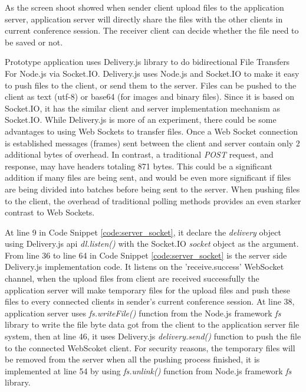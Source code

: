 \par As the screen shoot showed when sender client upload files to the application server, application server will directly share the files with the other clients in current conference session. The receiver client can decide whether the file need to be saved or not.

\par Prototype application uses Delivery.js library to do bidirectional File Transfers For Node.js via Socket.IO. Delivery.js uses Node.js and Socket.IO to make it easy to push files to the client, or send them to the server. Files can be pushed to the client as text (utf-8) or base64 (for images and binary files).\cite{github:deliveryjs} Since it is based on Socket.IO, it has the similar client and server implementation mechanism as Socket.IO. While Delivery.js is more of an experiment, there could be some advantages to using Web Sockets to transfer files. Once a Web Socket connection is established messages (frames) sent between the client and server contain only 2 additional bytes of overhead. In contrast, a traditional \textit{POST} request, and response, may have headers totaling 871 bytes. This could be a significant addition if many files are being sent, and would be even more significant if files are being divided into batches before being sent to the server. When pushing files to the client, the overhead of traditional polling methods provides an even starker contrast to Web Sockets.

\par At line 9 in Code Snippet \ref{code:server_socket}, it declare the \textit{delivery} object using Delivery.js \gls{api} \textit{dl.listen()} with the Socket.IO \textit{socket} object as the argument. From line 36 to line 64 in Code Snippet \ref{code:server_socket} is the server side Delivery.js implementation code. It listens on the 'receive.success' WebSocket channel, when the upload files from client are received successfully the application server will make temporary files for the upload files and push these files to every connected clients in sender's current conference session. At line 38, application server uses \textit{fs.writeFile()} function from the Node.js framework \textit{fs} library to write the file byte data got from the client to the application server file system, then at line 46, it uses Delivery.js \textit{delivery.send()} function to push the file to the connected WebScoket client. For security reasons, the temporary files will be removed from the server when all the pushing process finished, it is implemented at line 54 by using \textit{fs.unlink()} function from Node.js framework \textit{fs} library.

